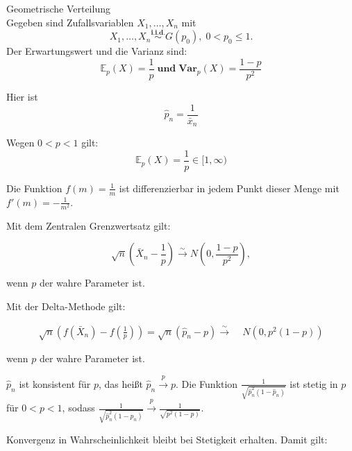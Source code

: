 \documentclass[10pt]{article}
\newcommand{\FZV}{X_1, \ldots, X_n} %
\newcommand{\EW}{\mathbb{E}} %
\newcommand{\KW}{\overset{p} \longrightarrow} %
\newcommand{\KV}{\overset{\sim} \longrightarrow} %
\newenvironment{BSP}[1][]
{\begin{Beispiel}[frametitle=#1]}{\end{Beispiel}}
\begin{document}
	
	\begin{BSP}[Beispiel 1.3.6 (Delta-Methode)]		
		\noindent Geometrische Verteilung \\
		Gegeben sind Zufallsvariablen $\FZV$ mit
		\begin{equation*}
			\FZV \overset{\textbf{i.i.d.}}{\sim} G(p_0), \; 0 < p_0 \leq 1.
		\end{equation*} 
		Der Erwartungswert und die Varianz sind:
		\begin{equation*}
			\EW_p(X) = \frac{1}{p} \; \textbf{und} \; \textbf{Var}_p(X) = \frac{1-p}{p^2}
		\end{equation*}
		
		\noindent Hier ist
		\begin{equation*}
			\hat{p}_n = \frac{1}{\bar{x}_n}
		\end{equation*}
		
		\noindent Wegen $0 < p < 1$ gilt:
		\begin{equation*}
			\EW_p(X) = {\frac{1}{p}} \in [1, \infty)
		\end{equation*}
		
		\noindent Die Funktion $f(m)= \frac{1}{m}$ ist differenzierbar in jedem Punkt dieser Menge mit $f'(m)= - \frac{1}{m^2}$. 
		
		\noindent Mit dem Zentralen Grenzwertsatz gilt:
		
		\begin{equation*}
			\sqrt{n}\left(\bar{X}_n - \frac{1}{p}\right) \KV N\left(0, \frac{1-p}{p^2}\right),
		\end{equation*}
		
		\noindent wenn $p$ der wahre Parameter ist. 
		
		\noindent Mit der Delta-Methode gilt:
		
		\begin{equation*}
			\begin{split}
				\sqrt{n} \left(f\left(\bar{X}_n\right)-f\left(\frac{1}{p}\right)\right) = \sqrt{n} (\hat{p}_n-p) \KV&\; N(0,p^2(1-p))
			\end{split}
		\end{equation*}
		
		\noindent wenn $p$ der wahre Parameter ist.
        
		
		$\hat{p}_n$ ist konsistent für $p$, das heißt $\hat{p}_n \KW p$.
		Die Funktion $\frac{1}{\sqrt{\hat{p}_n^2(1-\hat{p}_n)}}$ ist stetig in $p$ für $0<p<1$, sodass  $\frac{1}{\sqrt{\hat{p}_n^2(1-\hat{p}_n)}} \KW  \frac{1}{\sqrt{p^2(1-p)}}$.
		
		\noindent Konvergenz in Wahrscheinlichkeit bleibt bei Stetigkeit erhalten. Damit gilt:
		

\end{BSP}
\end{document}

